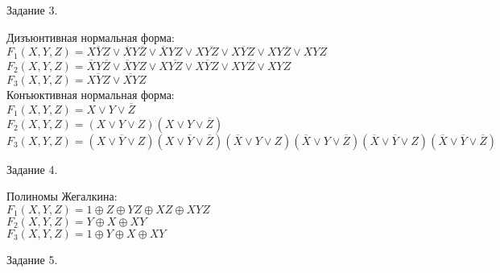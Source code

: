 \documentclass[a4paper,12pt]{report} %
\begin{document}
\bigskip

       
\begin{center}
Задание 3.
\end{center}

\begin{flushleft}
Дизъюнтивная нормальная форма:\\
$F_1(X,Y,Z)=\overline{XYZ} \vee \overline{X}Y\overline{Z} \vee \overline{X}YZ \vee X\overline{YZ} \vee X\overline{Y}Z \vee XY\overline{Z} \vee XYZ$\\
$F_2(X,Y,Z)=\overline{X}Y\overline{Z} \vee \overline{X}YZ \vee X\overline{YZ} \vee X\overline{Y}Z \vee XY\overline{Z} \vee XYZ$\\
$F_3(X,Y,Z)=\overline{XYZ} \vee \overline{XY}Z$\\
\bigskip
Конъюктивная нормальная форма:\\
$F_1(X,Y,Z)=X \vee Y \vee \overline{Z}$\\
$F_2(X,Y,Z)=(X\vee Y\vee Z)(X\vee Y\vee\overline{Z})$\\
$F_3(X,Y,Z)=(X\vee \overline{Y}\vee Z)(X \vee \overline{Y} \vee \overline{Z})(\overline{X} \vee Y \vee Z)(\overline{X} \vee Y \vee \overline{Z})(\overline{X} \vee \overline{Y} \vee Z)(\overline{X} \vee \overline{Y} \vee \overline{Z})$\\
\end{flushleft}

\bigskip


\begin{center}
Задание 4.\\
\end{center}

\begin{flushleft}
Полиномы Жегалкина:\\
$F_1(X,Y,Z)=1 \oplus Z \oplus YZ \oplus XZ \oplus XYZ$\\
$F_2(X,Y,Z)=Y \oplus X \oplus XY$\\
$F_3(X,Y,Z)=1 \oplus Y \oplus X \oplus XY$\\
\end{flushleft}

\bigskip

\begin{center}
Задание 5.\\
\end{center}

\begin{flushleft}

\end{flushleft}
\end{document}
